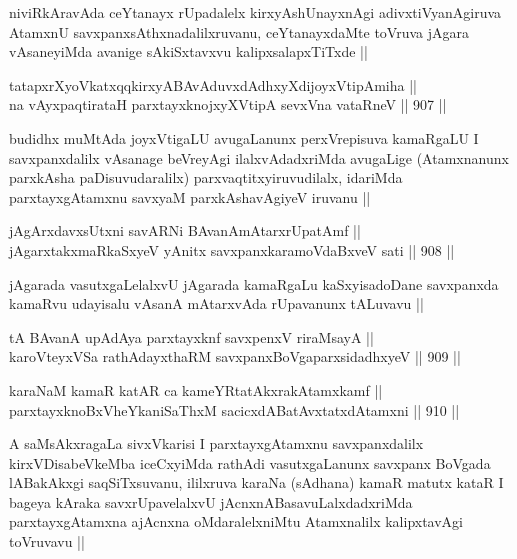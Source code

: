\begin{artha}
niviRkAravAda ceYtanayx rUpadalelx kirxyAshUnayxnAgi adivxtiVyanAgiruva AtamxnU savxpanxsAthxnadalilxruvanu, ceYtanayxdaMte toVruva jAgara vAsaneyiMda avanige sAkiSxtavxvu kalipxsalapxTiTxde ||
\end{artha}

\begin{shl}
tatapxrXyoVkatxqqkirxyABAvAduvxdAdhxyXdijoyxVtipAmiha || \\
na vAyxpaqtirataH parxtayxknojxyXVtipA sevxVna vataRneV ||  907 ||  
\end{shl}

\begin{artha}
budidhx muMtAda joyxVtigaLU avugaLanunx perxVrepisuva kamaRgaLU I savxpanxdalilx vAsanage beVreyAgi ilalxvAdadxriMda avugaLige (Atamxnanunx parxkAsha paDisuvudaralilx) parxvaqtitxyiruvudilalx, idariMda parxtayxgAtamxnu savxyaM parxkAshavAgiyeV iruvanu ||
\end{artha}


\begin{shl}
jAgArxdavxsUtxni savARNi BAvanAmAtarxrUpatAmf || \\
jAgarxtakxmaRkaSxyeV yAnitx savxpanxkaramoVdaBxveV sati ||  908 ||  
\end{shl}

\begin{artha}
jAgarada vasutxgaLelalxvU jAgarada kamaRgaLu kaSxyisadoDane savxpanxda kamaRvu udayisalu vAsanA mAtarxvAda rUpavanunx tALuvavu ||
\end{artha}


\begin{shl}
tA BAvanA upAdAya parxtayxknf savxpenxV riraMsayA ||  \\
karoVteyxVSa rathAdayxthaRM savxpanxBoVgaparxsidadhxyeV ||  909 ||  
\end{shl}
				
\begin{shl}
karaNaM kamaR katAR ca kameYRtatAkxrakAtamxkamf || \\
parxtayxknoBxVheYkaniSaThxM sacicxdABatAvxtatxdAtamxni ||  910 ||  
\end{shl}

\begin{artha}
A saMsAkxragaLa sivxVkarisi I parxtayxgAtamxnu savxpanxdalilx kirxVDisabeVkeMba iceCxyiMda rathAdi vasutxgaLanunx savxpanx BoVgada lABakAkxgi saqSiTxsuvanu, ililxruva karaNa (sAdhana) kamaR matutx kataR I bageya kAraka savxrUpavelalxvU jAcnxnABasavuLalxdadxriMda parxtayxgAtamxna ajAcnxna oMdaralelxniMtu Atamxnalilx kalipxtavAgi toVruvavu ||
\end{artha}

